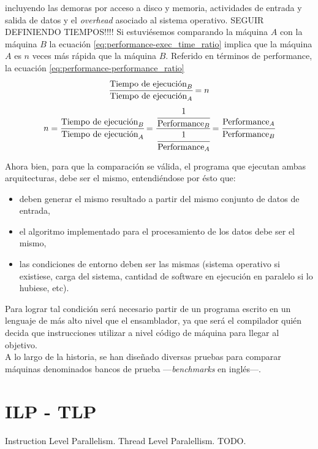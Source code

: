 incluyendo las demoras por acceso a disco y memoria, actividades de entrada y 
salida de datos y el \emph{overhead} asociado al sistema operativo. SEGUIR 
DEFINIENDO TIEMPOS!!!! Si estuviésemos comparando la máquina $A$ con la máquina 
$B$ la ecuación \ref{eq:performance-exec_time_ratio} implica que la máquina $A$ 
es $n$ veces más rápida que la máquina $B$. Referido en términos de 
performance, la ecuación \ref{eq:performance-performance_ratio}
\begin{equation}
  \label{eq:performance-exec_time_ratio}
  \cfrac{\text{Tiempo de ejecución}_{B}}{\text{Tiempo de ejecución}_{A}} = n
\end{equation}
\begin{equation}
  \label{eq:performance-performance_ratio}
  n = \cfrac{\text{Tiempo de ejecución}_{B}}{\text{Tiempo de ejecución}_{A}} = 
\cfrac{\cfrac{1}{\text{Performance}_{B}}}{\cfrac{1}{\text{Performance}_{A}}} = 
\cfrac{\text{Performance}_{A}}{\text{Performance}_{B}}
\end{equation}

Ahora bien, para que la comparación se válida, el programa que ejecutan ambas 
arquitecturas, debe ser el mismo, entendiéndose por ésto que:
\begin{itemize}
  \item deben generar el mismo resultado a partir del mismo conjunto de 
datos de entrada,
  \item el algoritmo implementado para el procesamiento de los datos debe ser 
el mismo,
  \item las condiciones de entorno deben ser las mismas (sistema operativo si 
existiese, carga del sistema, cantidad de software en ejecución en paralelo si 
lo hubiese, etc).
\end{itemize}
Para lograr tal condición será necesario partir de un programa escrito en un 
lenguaje de más alto nivel que el ensamblador, ya que será el compilador quién 
decida que instrucciones utilizar a nivel código de máquina para llegar al 
objetivo.\\
A lo largo de la historia, se han diseñado diversas pruebas para comparar 
máquinas denominados bancos de prueba ---\emph{benchmarks} en 
inglés---. 



\section{ILP - TLP}
\label{sec:ilp_tlp}

Instruction Level Parallelism. Thread Level Paralellism. TODO.

